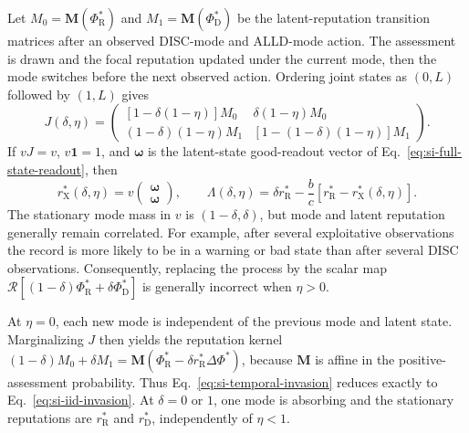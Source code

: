 \documentclass[fleqn,10pt]{wlscirep}
\begin{document}
Let $M_0=\mathbf M(\Phi_{\mathrm R}^*)$ and $M_1=\mathbf M(\Phi_{\mathrm D}^*)$ be the latent-reputation transition matrices after an observed DISC-mode and ALLD-mode action. The assessment is drawn and the focal reputation updated under the current mode, then the mode switches before the next observed action. Ordering joint states as $(0,L)$ followed by $(1,L)$ gives
\begin{equation}
J(\delta,\eta)=
\begin{pmatrix}
[1-\delta(1-\eta)]M_0 & \delta(1-\eta)M_0\\
(1-\delta)(1-\eta)M_1 & [1-(1-\delta)(1-\eta)]M_1
\end{pmatrix}.
\label{eq:si-temporal-joint-kernel}
\end{equation}
If $vJ=v$, $v\mathbf1=1$, and $\boldsymbol\omega$ is the latent-state good-readout vector of Eq.~\eqref{eq:si-full-state-readout}, then
\begin{equation}
r_{\mathrm X}^*(\delta,\eta)
=v\begin{pmatrix}\boldsymbol\omega\\\boldsymbol\omega\end{pmatrix},
\qquad
\Lambda(\delta,\eta)=\delta r_{\mathrm R}^*-\frac bc[r_{\mathrm R}^*-r_{\mathrm X}^*(\delta,\eta)].
\label{eq:si-temporal-invasion}
\end{equation}
The stationary mode mass in $v$ is $(1-\delta,\delta)$, but mode and latent reputation generally remain correlated. For example, after several exploitative observations the record is more likely to be in a warning or bad state than after several DISC observations. Consequently, replacing the process by the scalar map $\mathcal R[(1-\delta)\Phi_{\mathrm R}^*+\delta\Phi_{\mathrm D}^*]$ is generally incorrect when $\eta>0$.

At $\eta=0$, each new mode is independent of the previous mode and latent state. Marginalizing $J$ then yields the reputation kernel $(1-\delta)M_0+\delta M_1=\mathbf M(\Phi_{\mathrm R}^*-\delta r_{\mathrm R}^*\Delta\Phi^*)$, because $\mathbf M$ is affine in the positive-assessment probability. Thus Eq.~\eqref{eq:si-temporal-invasion} reduces exactly to Eq.~\eqref{eq:si-iid-invasion}. At $\delta=0$ or $1$, one mode is absorbing and the stationary reputations are $r_{\mathrm R}^*$ and $r_{\mathrm D}^*$, independently of $\eta<1$.
\end{document}
